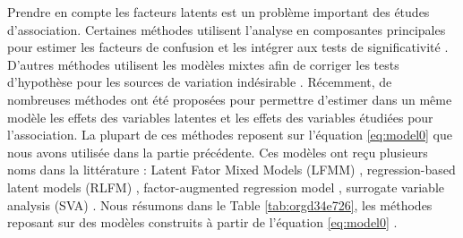 \documentclass[12pt,a4paper,twoside]{ugathesis}
\begin{document}
Prendre en compte les facteurs latents est un problème important des études
d'association. Certaines méthodes utilisent l'analyse en composantes principales
pour estimer les facteurs de confusion et les intégrer aux tests de
significativité \citep{Rahmani_2016,Price_2006}. D'autres méthodes utilisent les
modèles mixtes afin de corriger les tests d'hypothèse pour les sources de
variation indésirable \citep{Kang_2008,Zhou_2014,Loh194944}. Récemment, de
nombreuses méthodes ont été proposées pour permettre d'estimer dans un même
modèle les effets des variables latentes et les effets des variables étudiées
pour l'association. La plupart de ces méthodes reposent sur l'équation
\eqref{eq:model0} que nous avons utilisée dans la partie précédente. Ces modèles
ont reçu plusieurs noms dans la littérature : Latent Fator Mixed Models (LFMM)
\citep{Frichot_2013}, regression-based latent models (RLFM)
\citep{agarwal09_regres}, factor-augmented regression model
\citep{gerard2017empirical}, surrogate variable analysis (SVA)
\citep{article_Leek_Storey_2007}. Nous résumons dans le Table
\ref{tab:orgd34e726}, les méthodes reposant sur des modèles construits à
partir de l'équation \eqref{eq:model0} .
\end{document}
